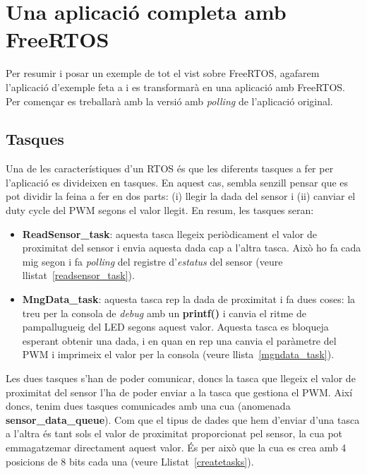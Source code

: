 \chapter{Una aplicació completa amb FreeRTOS}

Per resumir i posar un exemple de tot el vist sobre \gls{FreeRTOS}, agafarem l'aplicació d'exemple feta a  i es transformarà en una aplicació amb FreeRTOS. Per començar es treballarà amb la versió amb {\em polling} de l'aplicació original.

\section{Tasques}
Una de les característiques d'un \gls{RTOS} és que les diferents tasques a fer per l'aplicació es divideixen en tasques. En aquest cas, sembla senzill pensar que es pot dividir la feina a fer en dos parts: (i) llegir la dada del sensor i (ii) canviar el \gls{duty cycle} del \gls{PWM} segons el valor llegit. En resum, les tasques seran:

\begin{itemize}
 \item {\bf ReadSensor\_task}: aquesta tasca llegeix periòdicament el valor de proximitat del sensor i envia aquesta dada cap a l'altra tasca. Això ho fa cada mig segon i fa {\em polling} del registre d'{\em estatus} del sensor (veure llistat~\ref{readsensor_task}).
 \item {\bf MngData\_task}: aquesta tasca rep la dada de proximitat i fa dues coses: la treu per la consola de {\em debug} amb un {\bf printf()} i canvia el ritme de pampallugueig del LED segons aquest valor. Aquesta tasca es bloqueja esperant obtenir una dada, i en quan en rep una canvia el paràmetre del \gls{PWM} i imprimeix el valor per la consola (veure llista~\ref{mgndata_task}).
\end{itemize}

Les dues tasques s'han de poder comunicar, doncs la tasca que llegeix el valor de proximitat del sensor l'ha de poder enviar a la tasca que gestiona el \gls{PWM}. Així doncs, tenim dues tasques comunicades amb una cua (anomenada {\bf sensor\_data\_queue}). Com que el tipus de dades que hem d'enviar d'una tasca a l'altra és tant sols el valor de proximitat proporcionat pel sensor, la cua pot emmagatzemar directament aquest valor. És per això que la cua es crea amb 4 posicions de 8 bits cada una (veure Llistat~\ref{createtasks}).

